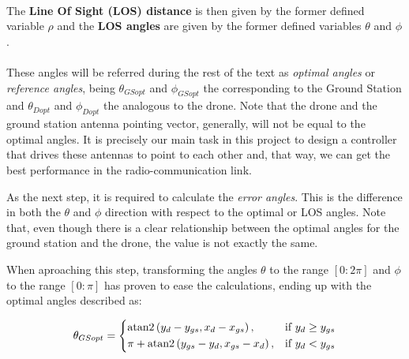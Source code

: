 \paragraph{} The \textbf{Line Of Sight (LOS) distance} is then given by the former defined variable $\rho$ and the \textbf{LOS angles} are given by the former defined variables $\theta$ and $\phi$.
\paragraph{} These angles will be referred during the rest of the text as \textit{optimal angles} or \textit{reference angles}, being $\theta_{GSopt}$ and $\phi_{GSopt}$ the corresponding to the Ground Station and $\theta_{Dopt}$ and $\phi_{Dopt}$ the analogous to the drone.
Note that the drone and the ground station antenna pointing vector, generally, will not be equal to the optimal angles. It is precisely our main task in this project to design a controller that drives these antennas to point to each other and, that way, we can get the best performance in the radio-communication link.


\begin{figure}[H]
   \centering
     
    \label{fig:OptimalAngles1}
\end{figure}

\begin{figure}[H]
   \centering
     
    \label{fig:OptimalAngles1}  
\end{figure}


As the next step, it is required to calculate the \textit{error angles}. This is the difference in both the $\theta$ and $\phi$ direction with respect to the optimal or LOS angles.
Note that, even though there is a clear relationship between the optimal angles for the ground station and the drone, the value is not exactly the same.

When aproaching this step, transforming the angles $\theta$ to the range $[0:2\pi]$ and $\phi$ to the range $[0:\pi]$ has proven to ease the calculations, ending up with the optimal angles described as:

\begin{equation}
  \theta_{GSopt}=
  \begin{dcases}
    {\rm atan2}\left(y_{d}-y_{gs}, x_{d}-x_{gs}\right), & \text{if } y_{d}\geq y_{gs}\\
    \pi + {\rm atan2}\left(y_{gs}-y_{d}, x_{gs}-x_{d}\right), & \text{if } y_{d} < y_{gs}
  \end{dcases}
\end{equation}

